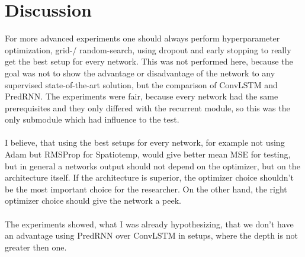 \section{Discussion} \label{section::discussion}
 For more advanced experiments one should always perform hyperparameter optimization, grid-/ random-search, using dropout and early stopping to really get the
 best setup for every network. This was not performed here, because the goal was not to show the advantage or disadvantage of the network to any supervised
 state-of-the-art solution, but the comparison of ConvLSTM and PredRNN. The experiments were fair, because every network had the same prerequisites and they only
 differed with the recurrent module, so this was the only submodule which had influence to the test.\\\\
 I believe, that using the best setups for every network, for example not using Adam but RMSProp for Spatiotemp, would give better mean MSE for testing, but
 in general a networks output should not depend on the optimizer, but on the architecture itself. If the architecture is superior, the optimizer choice shouldn't
 be the most important choice for the researcher. On the other hand, the right optimizer choice should give the network a peek.\\\\
 The experiments showed, what I was already hypothesizing, that we don't have an advantage using PredRNN over ConvLSTM in setups, where the depth is not greater then
 one.\\\\